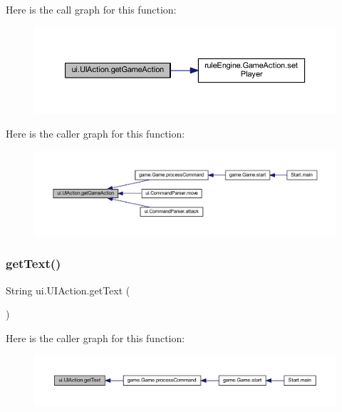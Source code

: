 Here is the call graph for this function\+:
\nopagebreak
\begin{figure}[H]
\begin{center}
\leavevmode
\includegraphics[width=350pt]{classui_1_1_u_i_action_a3185db453138fe37b085f1427f7aca62_cgraph}
\end{center}
\end{figure}
Here is the caller graph for this function\+:
\nopagebreak
\begin{figure}[H]
\begin{center}
\leavevmode
\includegraphics[width=350pt]{classui_1_1_u_i_action_a3185db453138fe37b085f1427f7aca62_icgraph}
\end{center}
\end{figure}
\mbox{\label{classui_1_1_u_i_action_a3712585143fbf58005d55618b813026f}} 
\subsubsection{\texorpdfstring{get\+Text()}{getText()}}
{\footnotesize\ttfamily String ui.\+U\+I\+Action.\+get\+Text (\begin{DoxyParamCaption}{ }\end{DoxyParamCaption})\hspace{0.3cm}{\ttfamily [inline]}}

Here is the caller graph for this function\+:
\nopagebreak
\begin{figure}[H]
\begin{center}
\leavevmode
\includegraphics[width=350pt]{classui_1_1_u_i_action_a3712585143fbf58005d55618b813026f_icgraph}
\end{center}
\end{figure}
\mbox{\label{classui_1_1_u_i_action_aa2b9a2f369994d628cb701d5dbc50698}} 
